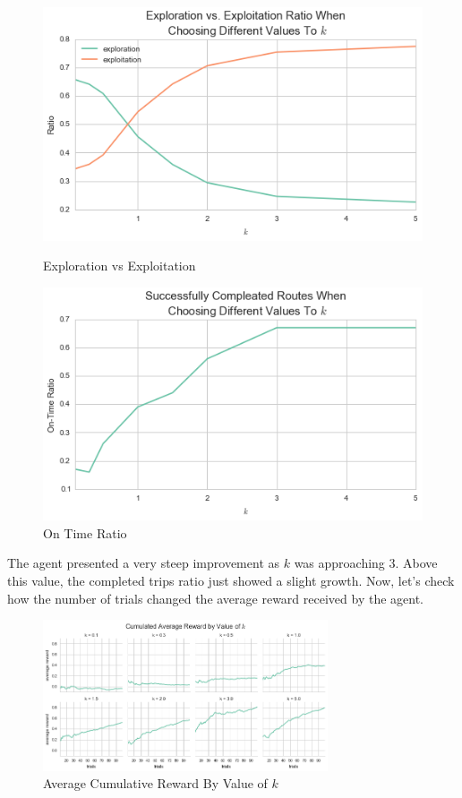 \documentclass[a4paper]{article}
\begin{document}
\begin{figure}[ht!]
  \includegraphics[width=\linewidth]{images/exploint_explore.png}
  \caption{\label{fig:exploint_explore}Exploration vs Exploitation}
\endminipage
{}
  \includegraphics[width=\linewidth]{images/success_runs.png}
  \caption{\label{fig:success_runs}On Time Ratio}
\endminipage
\end{figure}

The agent presented a very steep improvement as $k$ was approaching $3$. Above this value, the completed trips ratio just showed a slight growth. Now, let's check how the number of trials changed the average reward received by the agent.

\begin{figure}[ht!]
\centering
\includegraphics[width=0.75\textwidth]{images/cum_reward_by_k.png}
\caption{\label{fig:cum_reward_by_k}Average Cumulative Reward By Value of $k$}
\end{figure}
\end{document}
